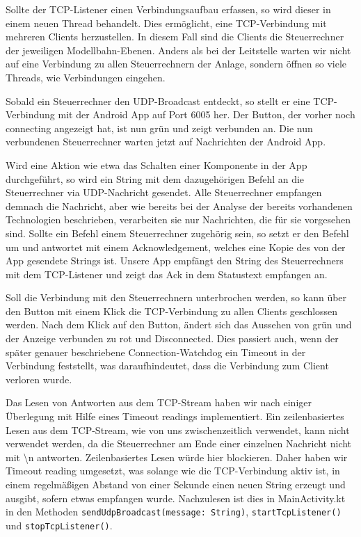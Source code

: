 \documentclass{article}
\begin{document}
Sollte der TCP-Listener einen Verbindungsaufbau erfassen, so wird dieser in einem neuen Thread behandelt.
Dies ermöglicht, eine TCP-Verbindung mit mehreren Clients herzustellen.
In diesem Fall sind die Clients die Steuerrechner der jeweiligen Modellbahn-Ebenen.
Anders als bei der Leitstelle warten wir nicht auf eine Verbindung zu allen Steuerrechnern der Anlage, sondern öffnen so viele Threads, wie Verbindungen eingehen.

Sobald ein Steuerrechner den UDP-Broadcast entdeckt, so stellt er eine TCP-Verbindung mit der Android App auf Port 6005 her.
Der Button, der vorher noch connecting angezeigt hat, ist nun grün und zeigt verbunden an.
Die nun verbundenen Steuerrechner warten jetzt auf Nachrichten der Android App.

Wird eine Aktion wie etwa das Schalten einer Komponente in der App durchgeführt, so wird ein String mit dem dazugehörigen Befehl an die Steuerrechner via UDP-Nachricht gesendet.
Alle Steuerrechner empfangen demnach die Nachricht, aber wie bereits bei der Analyse der bereits vorhandenen Technologien beschrieben, verarbeiten sie nur Nachrichten, die für sie vorgesehen sind.
Sollte ein Befehl einem Steuerrechner zugehörig sein, so setzt er den Befehl um und antwortet mit einem Acknowledgement, welches eine Kopie des von der App gesendete Strings ist.
Unsere App empfängt den String des Steuerrechners mit dem TCP-Listener und zeigt das Ack in dem Statustext empfangen an.

Soll die Verbindung mit den Steuerrechnern unterbrochen werden, so kann über den Button mit einem Klick die TCP-Verbindung zu allen Clients geschlossen werden.
Nach dem Klick auf den Button, ändert sich das Aussehen von grün und der Anzeige verbunden zu rot und Disconnected.
Dies passiert auch, wenn der später genauer beschriebene Connection-Watchdog ein Timeout in der Verbindung feststellt, was daraufhindeutet, dass die Verbindung zum Client verloren wurde.

Das Lesen von Antworten aus dem TCP-Stream haben wir nach einiger Überlegung mit Hilfe eines Timeout readings implementiert.
Ein zeilenbasiertes Lesen aus dem TCP-Stream, wie von uns zwischenzeitlich verwendet, kann nicht verwendet werden, da die Steuerrechner am Ende einer einzelnen Nachricht nicht mit \textbackslash n antworten.
Zeilenbasiertes Lesen würde hier blockieren.
Daher haben wir Timeout reading umgesetzt, was solange wie die TCP-Verbindung aktiv ist, in einem regelmäßigen Abstand von einer Sekunde einen neuen String erzeugt und ausgibt, sofern etwas empfangen wurde.
Nachzulesen ist dies in MainActivity.kt in den Methoden \texttt{sendUdpBroadcast(message: String)}, \texttt{startTcpListener()} und \texttt{stopTcpListener()}.
\end{document}

